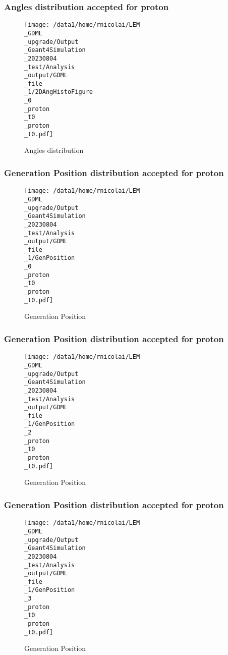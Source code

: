 \documentclass[8pt]{beamer}
\begin{document}
            \begin{frame}
                \frametitle{Angles distribution accepted for proton}
            
        \begin{figure}[h]
            \centering
            \texttt{[image: /data1/home/rnicolai/LEM\\\_GDML\\\_upgrade/Output\\\_Geant4Simulation\\\_20230804\\\_test/Analysis\\\_output/GDML\\\_file\\\_1/2DAngHistoFigure\\\_0\\\_proton\\\_t0\\\_proton\\\_t0.pdf]}
            \caption{Angles distribution}
        \end{figure}
        
            \end{frame}
            
            \begin{frame}
                \frametitle{Generation Position distribution accepted for proton}
            
        \begin{figure}[h]
            \centering
            \texttt{[image: /data1/home/rnicolai/LEM\\\_GDML\\\_upgrade/Output\\\_Geant4Simulation\\\_20230804\\\_test/Analysis\\\_output/GDML\\\_file\\\_1/GenPosition\\\_0\\\_proton\\\_t0\\\_proton\\\_t0.pdf]}
            \caption{Generation Position}
        \end{figure}
        
            \end{frame}
            
            \begin{frame}
                \frametitle{Generation Position distribution accepted for proton}
            
        \begin{figure}[h]
            \centering
            \texttt{[image: /data1/home/rnicolai/LEM\\\_GDML\\\_upgrade/Output\\\_Geant4Simulation\\\_20230804\\\_test/Analysis\\\_output/GDML\\\_file\\\_1/GenPosition\\\_2\\\_proton\\\_t0\\\_proton\\\_t0.pdf]}
            \caption{Generation Position}
        \end{figure}
        
            \end{frame}
            
            \begin{frame}
                \frametitle{Generation Position distribution accepted for proton}
            
        \begin{figure}[h]
            \centering
            \texttt{[image: /data1/home/rnicolai/LEM\\\_GDML\\\_upgrade/Output\\\_Geant4Simulation\\\_20230804\\\_test/Analysis\\\_output/GDML\\\_file\\\_1/GenPosition\\\_3\\\_proton\\\_t0\\\_proton\\\_t0.pdf]}
            \caption{Generation Position}
        \end{figure}
        
            \end{frame}
            
\end{document}
